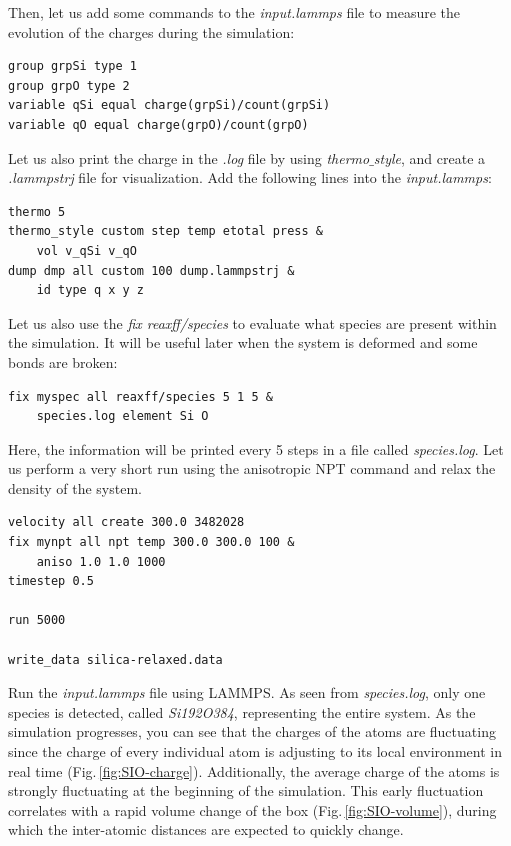 \documentclass[9pt,tutorial]{livecoms}
\begin{document}
Then, let us add some commands to the \textit{input.lammps} file  to measure the evolution of the charges during the simulation:
{\normalsize \begin{verbatim}
group grpSi type 1
group grpO type 2
variable qSi equal charge(grpSi)/count(grpSi)
variable qO equal charge(grpO)/count(grpO)
\end{verbatim}}
Let us also print the charge in the \textit{.log} file by using \textit{thermo$\_$style}, and create a \textit{.lammpstrj} file for visualization. Add the following lines into the \textit{input.lammps}:
{\normalsize \begin{verbatim}
thermo 5
thermo_style custom step temp etotal press &
    vol v_qSi v_qO
dump dmp all custom 100 dump.lammpstrj &
    id type q x y z
\end{verbatim}}
Let us also use the \textit{fix reaxff/species} to evaluate what species are present within the simulation. It will be useful later when the system is deformed and some bonds are broken:
{\normalsize \begin{verbatim}
fix myspec all reaxff/species 5 1 5 &
    species.log element Si O
\end{verbatim}}
Here, the information will be printed every 5 steps in a file called \textit{species.log}. Let us perform a very short run using the anisotropic NPT command and relax the density of the system.
{\normalsize \begin{verbatim}
velocity all create 300.0 3482028
fix mynpt all npt temp 300.0 300.0 100 &
    aniso 1.0 1.0 1000
timestep 0.5

run 5000

write_data silica-relaxed.data
\end{verbatim}}
Run the \textit{input.lammps} file using LAMMPS. As seen from \textit{species.log}, only one species is detected, called \textit{Si192O384}, representing the entire system. As the simulation progresses, you can see that the charges of the atoms are fluctuating since the charge of every individual atom is adjusting to its local environment in real time (Fig.\,\ref{fig:SIO-charge}). Additionally, the average charge of the atoms is strongly fluctuating at the beginning of the simulation. This early fluctuation correlates with a rapid volume change of the box (Fig.\,\ref{fig:SIO-volume}), during which the inter-atomic distances are expected to quickly change.
\end{document}
